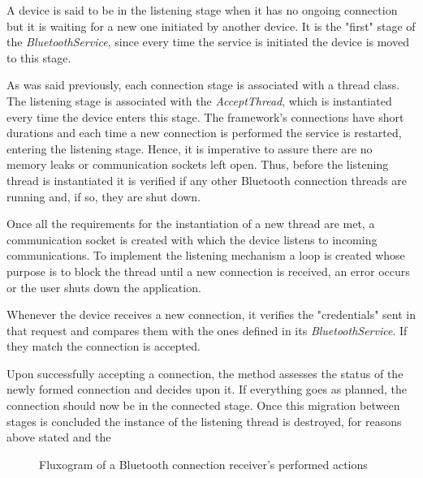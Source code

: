 A device is said to be in the listening stage when it has no ongoing connection but it is waiting for a new one initiated by another device. It is the "first" stage of the \textit{BluetoothService}, since every time the service is initiated the device is moved to this stage.

As was said previously, each connection stage is associated with a thread class. The listening stage is associated with the \textit{AcceptThread}, which is instantiated every time the device enters this stage. The framework's connections have short durations and each time a new connection is performed the service is restarted, entering the listening stage. Hence, it is imperative to assure there are no memory leaks or communication sockets left open. Thus, before the listening thread is instantiated it is verified if any other Bluetooth connection threads are running and, if so, they are shut down.

Once all the requirements for the instantiation of a new thread are met, a communication socket is created with which the device listens to incoming communications. To implement the listening mechanism a loop is created whose purpose is to block the thread until a new connection is received, an error occurs or the user shuts down the application.

Whenever the device receives a new connection, it verifies the "credentials" sent in that request and compares them with the ones defined in its \textit{BluetoothService}. If they match the connection is accepted.

Upon successfully accepting a connection, the method assesses the status of the newly formed connection and decides upon it. If everything goes as planned, the connection should now be in the connected stage. Once this migration between stages is concluded the instance of the listening thread is destroyed, for reasons above stated and the 

\begin{figure}[ht]
	\noindent{}
	\caption{\label{fig:btreceiver} Fluxogram of a Bluetooth connection receiver's performed actions}
\end{figure}

